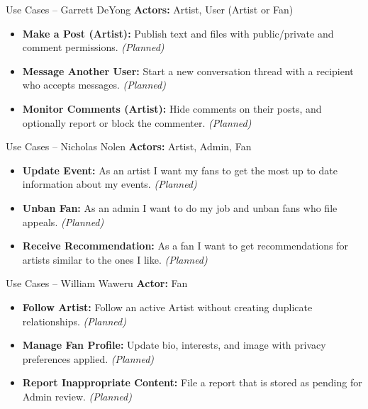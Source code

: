 \documentclass[11pt,aspectratio=169]{beamer}
\begin{document}
\begin{frame}{Use Cases -- Garrett DeYong}
\textbf{Actors:} Artist, User (Artist or Fan)
\vspace{0.5em}
\begin{itemize}
  \item \textbf{Make a Post (Artist):} Publish text and files with public/private and comment permissions. \textit{(Planned)}
  \item \textbf{Message Another User:} Start a new conversation thread with a recipient who accepts messages. \textit{(Planned)}
  \item \textbf{Monitor Comments (Artist):} Hide comments on their posts, and optionally report or block the commenter. \textit{(Planned)}
\end{itemize}
\end{frame}

\begin{frame}{Use Cases -- Nicholas Nolen}
\textbf{Actors:} Artist, Admin, Fan
\vspace{0.5em}
\begin{itemize}
  \item \textbf{Update Event:} As an artist I want my fans to get the most up to date information about my events. \textit{(Planned)}
  \item \textbf{Unban Fan:} As an admin I want to do my job and unban fans who file appeals. \textit{(Planned)}
  \item \textbf{Receive Recommendation:} As a fan I want to get recommendations for artists similar to the ones I like. \textit{(Planned)}
\end{itemize}
\end{frame}

\begin{frame}{Use Cases -- William Waweru}
\textbf{Actor:} Fan
\vspace{0.5em}
\begin{itemize}
  \item \textbf{Follow Artist:} Follow an active Artist without creating duplicate relationships. \textit{(Planned)}
  \item \textbf{Manage Fan Profile:} Update bio, interests, and image with privacy preferences applied. \textit{(Planned)}
  \item \textbf{Report Inappropriate Content:} File a report that is stored as pending for Admin review. \textit{(Planned)}
\end{itemize}
\end{frame}
\end{document}
